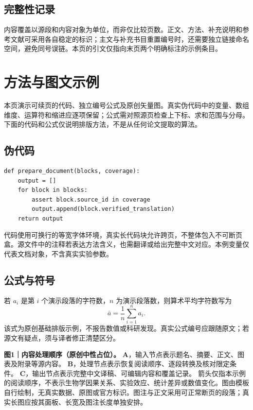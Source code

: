 \documentclass[UTF8,fontset=none,scheme=plain]{ctexart}
\newcommand{\PreprintCaption}[1]{\par\begingroup\fontsize{8.5bp}{11.5bp}\selectfont #1\par\endgroup}
\begin{document}
\subsection*{完整性记录}
内容覆盖以源段和内容对象为单位，而非仅比较页数。正文、方法、补充说明和参考文献可采用各自稳定的标识；主文与补充书目重置编号时，还需要独立链接命名空间，避免同号误链。本页的引文仅指向末页两个明确标注的示例条目。

\clearpage
\section*{方法与图文示例}
本页演示可续页的代码、独立编号公式及原创矢量图。真实伪代码中的变量、数组维度、运算符和缩进应逐项保留；公式需对照源页检查上下标、求和范围与分母。下面的代码和公式仅说明排版方法，不是从任何论文提取的算法。
\subsection*{伪代码}
\begin{Verbatim}
def prepare_document(blocks, coverage):
    output = []
    for block in blocks:
        assert block.source_id in coverage
        output.append(block.verified_translation)
    return output
\end{Verbatim}
代码使用可换行的等宽字体环境，真实长代码块允许跨页，不整体包入不可断页盒。源文件中的注释若表达方法含义，也需翻译或给出完整中文对应。本例变量仅代表文档对象，不含真实实验参数。

\subsection*{公式与符号}
若 $a_i$ 是第 $i$ 个演示段落的字符数，$n$ 为演示段落数，则算术平均字符数写为
\begin{equation}
\bar a=\frac{1}{n}\sum_{i=1}^{n}a_i.\tag{1}
\end{equation}
该式为原创基础排版示例，不报告数值或科研发现。真实公式编号应跟随原文；若源文有疑点，须与译者修正清楚区分。

\vspace{8bp}
\begin{center}\begin{minipage}{.94\textwidth}\DemoVector\end{minipage}\end{center}
\PreprintCaption{\textbf{图1｜内容处理顺序（原创中性占位）。}
\textbf{A}，输入节点表示题名、摘要、正文、图表及附录等源内容。
\textbf{B}，处理节点表示恢复阅读顺序、逐段转换及核对限定条件。
\textbf{C}，输出节点表示完整中文译稿、可编辑内容和覆盖记录。
箭头仅指本示例的阅读顺序，不表示生物学因果关系、实验效应、统计差异或数值变化。图由模板自行绘制，无真实数据、原图或官方标识。图注与正文采用可正常断页的段落；真实长图应按其面板、长宽及图注长度单独安排。}
\end{document}
